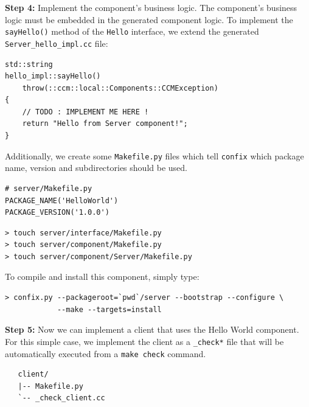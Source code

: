 \noindent
{\bf Step 4:} Implement the component's business logic.
The component's business logic must be embedded in the generated
component logic. 
To implement the {\tt sayHello()} method of the {\tt Hello} interface,
we extend the generated {\tt Server\_hello\_impl.cc} file:
\begin{small}
\begin{verbatim}
std::string
hello_impl::sayHello()
    throw(::ccm::local::Components::CCMException)
{
    // TODO : IMPLEMENT ME HERE !
    return "Hello from Server component!";
}
\end{verbatim}
\end{small}

\noindent
Additionally, we create some {\tt Makefile.py} files which tell
{\tt confix} which package name, version and subdirectories
should be used.
\begin{small}
\begin{verbatim}
# server/Makefile.py
PACKAGE_NAME('HelloWorld')
PACKAGE_VERSION('1.0.0')
\end{verbatim}
\end{small}

\begin{small}
\begin{verbatim}
> touch server/interface/Makefile.py
> touch server/component/Makefile.py
> touch server/component/Server/Makefile.py
\end{verbatim}
\end{small}

\noindent
To compile and install this component, simply type: 
\begin{small}
\begin{verbatim}
> confix.py --packageroot=`pwd`/server --bootstrap --configure \
            --make --targets=install
\end{verbatim}
\end{small}


\noindent
{\bf Step 5:} Now we can implement a client that uses the Hello World
component. For this simple case, we implement the client as a {\tt \_check*}
file that will be automatically executed from a {\tt make check} command.

\begin{small}
\begin{verbatim}
   client/
   |-- Makefile.py
   `-- _check_client.cc
\end{verbatim}
\end{small}

